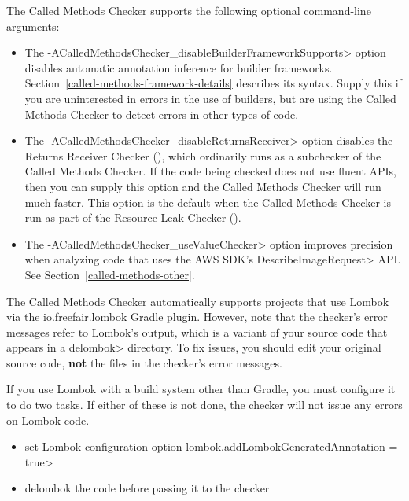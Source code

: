 The Called Methods Checker supports the following optional command-line arguments:
\begin{itemize}
\item The \<-ACalledMethodsChecker\_disableBuilderFrameworkSupports> option disables automatic
 annotation inference for builder frameworks.
 Section~\ref{called-methods-framework-details} describes its syntax.
 Supply this if you are uninterested in errors in the use of builders, but
 are using the Called Methods Checker to detect errors in other types of
 code.
\item The \<-ACalledMethodsChecker\_disableReturnsReceiver> option disables
  the Returns Receiver Checker (),
  which ordinarily runs as a subchecker of the Called Methods Checker.  If
  the code being checked does not use fluent APIs, then you can supply this
  option and the Called Methods Checker will run much faster. This option is the default
  when the Called Methods Checker is run as part of the Resource Leak Checker ().
\item The \<-ACalledMethodsChecker\_useValueChecker> option improves precision when analyzing
 code that uses the AWS SDK's \<DescribeImageRequest> API\@.  See
 Section~\ref{called-methods-other}.
\end{itemize}


The Called Methods Checker automatically supports projects that use Lombok via
the \href{https://plugins.gradle.org/plugin/io.freefair.lombok}{io.freefair.lombok} Gradle plugin.
However, note that the checker's error messages refer to Lombok's output, which is a variant of your source code
that appears in a \<delombok> directory.
To fix issues, you should edit your original source code, \textbf{not} the files in the checker's error messages.

If you use Lombok with a build system other than Gradle, you must configure it to do two tasks.
If either of these is not done, the checker will not issue any errors on Lombok code.
\begin{itemize}
\item set Lombok configuration option \<lombok.addLombokGeneratedAnnotation = true>
\item delombok the code before passing it to the checker
\end{itemize}



